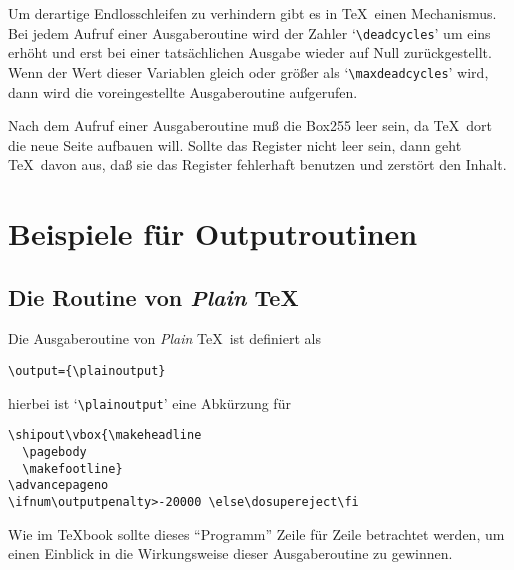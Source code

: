 Um derartige Endlosschleifen zu verhindern gibt es in \TeX\ einen
Mechanismus. Bei jedem Aufruf einer Ausgaberoutine wird der Zahler
`\verb|\deadcycles|' um eins erh\"oht und erst bei einer tats\"achlichen
Ausgabe wieder auf Null zur\"uckgestellt. Wenn der Wert dieser Variablen
gleich oder gr\"o\ss{}er als
`\verb|\maxdeadcycles|' wird, dann wird die
voreingestellte Ausgaberoutine aufgerufen.

Nach dem Aufruf einer Ausgaberoutine mu\ss{} die Box255
leer sein, da
\TeX\ dort die 
neue Seite aufbauen will. Sollte das Register nicht
leer sein, dann geht \TeX\ davon aus, da\ss{} sie das Register
fehlerhaft
benutzen und zerst\"ort den Inhalt.
\section{Beispiele f\"ur Outputroutinen}
\subsection{Die Routine von {\em Plain} \TeX}
Die Ausgaberoutine von {\em Plain} \TeX\ ist definiert als
\begin{verbatim}
\output={\plainoutput}
\end{verbatim}
hierbei ist `\verb|\plainoutput|' eine 
Abk\"urzung f\"ur
\begin{verbatim}
\shipout\vbox{\makeheadline
  \pagebody
  \makefootline}
\advancepageno
\ifnum\outputpenalty>-20000 \else\dosupereject\fi
\end{verbatim}
Wie im \TeX book sollte dieses ``Programm'' Zeile f\"ur Zeile betrachtet
werden, um einen Einblick in die Wirkungsweise dieser Ausgaberoutine
zu gewinnen.

